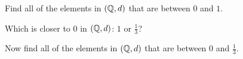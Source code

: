 {\ba

\item Find all of the elements in $(\mathbb{Q},d)$ that are between $0$ and $1$.  

\item Which is closer to $0$ in $(\mathbb{Q},d)$: $1$ or $\frac{1}{3}$?

\item Now find all of the elements in $(\mathbb{Q},d)$ that are between $0$ and $\frac{1}{3}$.  

\ea
	

\begin{comment}

\ExerciseSolution

	\ba
\item Since $0 = \frac{0}{1}$ and $1 = \frac{1}{1}$ we have that $d(0,1) = 1$. So if $b = \frac{u}{v}$ is between $0$ and $1$, then 
\[1 = d(0,b) + d(b,1).\]
Now $d(0,b) = \max\{|u|, |v-1|\}$ and $d(1,b) = \max\{|u-1|, |v-1|\}$. We consider the cases. 
	\begin{itemize}
	\item Suppose $d(0,b) = |u|$ and $d(1,b) = |u-1|$. Then 
\[1 = |u| + |u-1|.\]
Since $u$ is an integer, the cases are $|u| = 0$ and $|u-1| = 1$, or $|u|=1$ and $|u-1| = 0$. When $u=0$, $b=0$.  When $|u-1|=0$ we have $u = 1$. The fact that  $|u-1| \geq |v-1|$ implies that $0 \geq |v-1|$ and $v = 1$. In this case $b = 1$. 

	\item Suppose $d(0,b) = |u|$ and $d(1,b) = |v-1|$. Then 
\[1 = |u| + |v-1|.\]
The cases are $|u|=0$ and $|v-1| = 1$, or $|u| = 1$ and $|v-1| = 0$.  When $u=0$, $b=0$. When $|v-1| = 0$ we must have $v = 1$. The fact that $0 = |v-1| \geq |u-1|$ implies that $u=1$. 

	\item Suppose $d(0,b) = |v-1|$ and $d(1,b) = |u-1|$. Then 
\[1 = |v-1| + |u-1|.\]
The cases are $|u-1|=0$ and $|v-1| = 1$, or $|u-1| = 1$ and $|v-1| = 0$.  When $|u-1|=0$ we have $u=1$. The fact that $0 = |u-1| \geq |v-1|$ tells us that $v=1$. So $b=1$. When $|v-1| = 0$, then $v=1$. The fact that  $0 = |v-1| \geq |u|$ implies that $u=0$. This makes $b=0$. 

	\item Suppose $d(0,b) = |v-1|$ and $d(a,b) = |v-1|$. Then 
\[1 = |v-1| + |v-1|.\]
But this is impossible when $v$ is an integer. 

	\end{itemize}
We conclude that the only rational numbers in $(\Q,d)$ between $0$ and $1$ are $b = 0$ and $b=1$. 


\end{comment}}
